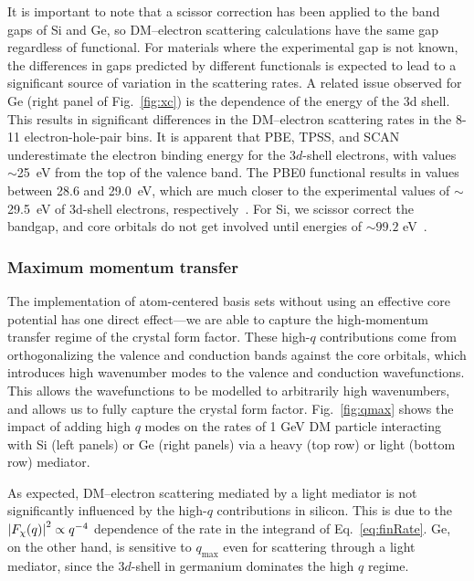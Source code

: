 \documentclass[
    prd, twocolumn, superscriptaddress, nofootinbib, amsmath, amssymb,
    aps, floatfix,preprintnumbers
]{revtex4-2}
\begin{document}
        It is important to note that a scissor correction has been applied to the band gaps of Si and Ge, so DM--electron scattering calculations have the same gap regardless of functional. For materials where the experimental gap is not known, the differences in gaps predicted by different functionals is expected to lead to a significant source of variation in the scattering rates. A related issue observed for Ge (right panel of Fig.~\ref{fig:xc}) is the dependence of the energy of the 3d shell. This results in significant differences in the DM--electron scattering rates in the 8-11 electron-hole-pair bins. It is apparent that PBE, TPSS, and SCAN underestimate the electron binding energy for the 3$d$-shell electrons, with values $\sim$25~eV from the top of the valence band. The PBE0 functional results in values between 28.6 and 29.0~eV, which are much closer to the experimental values of $\sim$29.5~eV of 3d-shell electrons, respectively~\cite{Bearden1967}. For Si, we scissor correct the bandgap, and core orbitals do not get involved until energies of $\sim 99.2$ eV~\cite{Bearden1967}.

        \subsubsection{Maximum momentum transfer}\label{subsubsec:qmax_uncertainty}
        
        The implementation of atom-centered basis sets without using an effective core potential has one direct effect---we are able to capture the high-momentum transfer regime of the crystal form factor. These high-$q$ contributions come from orthogonalizing the valence and conduction bands against the core orbitals, which introduces high wavenumber modes to the valence and conduction wavefunctions. This allows the wavefunctions to be modelled to arbitrarily high wavenumbers, and allows us to fully capture the crystal form factor. Fig.~\ref{fig:qmax} shows the impact of adding high $q$ modes on the rates of 1 GeV DM particle interacting with Si (left panels) or Ge (right panels)  via a heavy (top row) or light (bottom row) mediator. 
        
        As expected, DM--electron scattering mediated by a light mediator is not significantly influenced by the high-$q$ contributions in silicon. This is due to the $\abs{F_\chi (q)}^2 \propto q^{-4}$ dependence of the rate in the integrand of Eq.~\eqref{eq:finRate}. Ge, on the other hand, is sensitive to $q_{\text{max}}$ even for scattering through a light mediator, since the 3$d$-shell in germanium dominates the high $q$ regime. 
        
\end{document}
